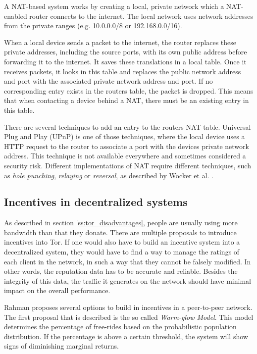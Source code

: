 \documentclass{article}
\begin{document}
		A NAT-based system works by creating a local, private network which a NAT-enabled router connects to the internet. The local network uses network addresses from the private ranges (e.g. 10.0.0.0/8 or 192.168.0.0/16).
		
		When a local device sends a packet to the internet, the router replaces these private addresses, including the source ports, with its own public address before forwarding it to the internet. It saves these translations in a local table. Once it receives packets, it looks in this table and replaces the public network address and port with the associated private network address and port. If no corresponding entry exists in the routers table, the packet is dropped. This means that when contacting a device behind a NAT, there must be an existing entry in this table.
		
		There are several techniques to add an entry to the routers NAT table. Universal Plug and Play (UPnP) is one of those techniques, where the local device uses a HTTP request to the router to associate a port with the devices private network address. This technique is not available everywhere and sometimes considered a security risk. Different implementations of NAT require different techniques, such as \textit{hole punching}, \textit{relaying} or \textit{reversal}, as described by Wocker et al. \cite{wacker2008nat}.

	\subsection{Incentives in decentralized systems}
		As described in section \ref{ss:tor_disadvantages}, people are usually using more bandwidth than that they donate. There are multiple proposals \cite{dingledine2010building, jansen13lira} to introduce incentives into Tor. If one would also have to build an incentive system into a decentralized system, they would have to find a way to manage the ratings of each client in the network, in such a way that they cannot be falsely modified. In other words, the reputation data has to be accurate and reliable. Besides the integrity of this data, the traffic it generates on the network should have minimal impact on the overall performance.
		
		Rahman \cite{rahman2009survey} proposes several options to build in incentives in a peer-to-peer network. The first proposal that is described is the so called \emph{Warm-glow Model}. This model determines the percentage of free-rides based on the probabilistic population distribution. If the percentage is above a certain threshold, the system will show signs of diminishing marginal returns.
		
\end{document}
